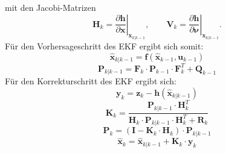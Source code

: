 mit den Jacobi-Matrizen
\begin{equation}
\mathbf{H}_k =
\left.\frac{\partial \mathbf{h}}{\partial \mathbf{x}}\right|_{{\mathbf{x}}_{k|k-1}},
\qquad
\mathbf{V}_k =
\left.\frac{\partial \mathbf{h}}{\partial \boldsymbol{\nu}}\right|_{{\mathbf{x}}_{k|k-1}}.
\end{equation}
Für den Vorhersageschritt des EKF ergibt sich somit:
\begin{equation}
   \hat{\mathbf{x}}_{k|k-1} = \mathbf{f}(\hat{\mathbf{x}}_{k-1}, \mathbf{u}_{k-1}) 
\end{equation}
\begin{equation}
    \mathbf{P}_{k|k-1} = \mathbf{F}_k \cdot \mathbf{P}_{k-1} \cdot \mathbf{F}_k^T +   \mathbf{Q}_{k-1} 
\end{equation}
Für den Korrekturschritt des EKF ergibt sich:
\begin{equation}
    \mathbf{y}_k = \mathbf{z}_k - \mathbf{h}(\hat{\mathbf{x}}_{k|k-1}) 
\end{equation}
\begin{equation}
    \mathbf{K}_k =  \frac{\mathbf{P}_{k|k-1} \cdot \mathbf{H}_{k}^T}{  \mathbf{H}_{k} \cdot \mathbf{P}_{k|k-1} \cdot \mathbf{H}_{k}^T +  \mathbf{R}_k }
\end{equation}
\begin{equation}
    \mathbf{P}_k = (\mathbf{I} - \mathbf{K}_k \cdot \mathbf{H}_{k}) \cdot \mathbf{P}_{k|k-1}
\end{equation}  
\begin{equation}
    \hat{\mathbf{x}}_k = \hat{\mathbf{x}}_{k|k-1} + \mathbf{K}_k \cdot \mathbf{y}_k
\end{equation}
